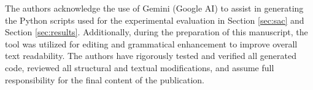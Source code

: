 \documentclass[conference]{IEEEtran}
\begin{document}
The authors acknowledge the use of Gemini (Google AI) to assist in generating the Python scripts used for the experimental evaluation in Section \ref{sec:sac} and Section \ref{sec:results}. Additionally, during the preparation of this manuscript, the tool was utilized for editing and grammatical enhancement to improve overall text readability. The authors have rigorously tested and verified all generated code, reviewed all structural and textual modifications, and assume full responsibility for the final content of the publication.


\end{document}

